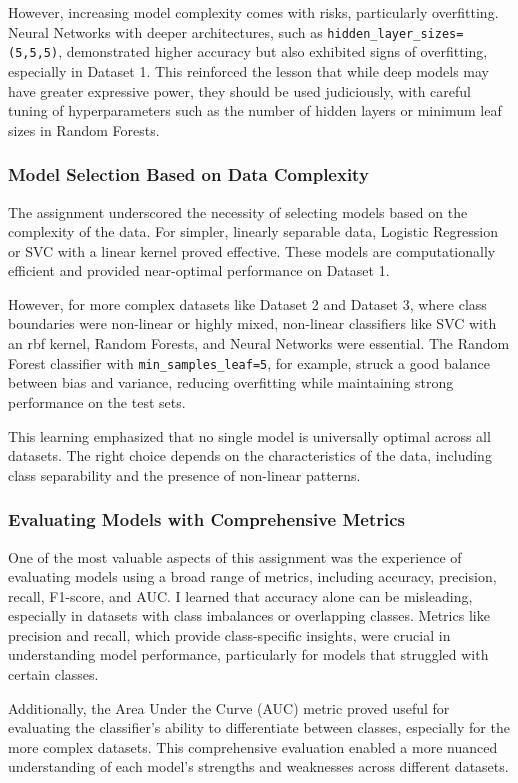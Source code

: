 However, increasing model complexity comes with risks, particularly overfitting. Neural Networks with deeper architectures, such as \texttt{hidden\_layer\_sizes=(5,5,5)}, demonstrated higher accuracy but also exhibited signs of overfitting, especially in Dataset 1. This reinforced the lesson that while deep models may have greater expressive power, they should be used judiciously, with careful tuning of hyperparameters such as the number of hidden layers or minimum leaf sizes in Random Forests.

\subsubsection*{Model Selection Based on Data Complexity}
The assignment underscored the necessity of selecting models based on the complexity of the data. For simpler, linearly separable data, Logistic Regression or SVC with a linear kernel proved effective. These models are computationally efficient and provided near-optimal performance on Dataset 1.

However, for more complex datasets like Dataset 2 and Dataset 3, where class boundaries were non-linear or highly mixed, non-linear classifiers like SVC with an rbf kernel, Random Forests, and Neural Networks were essential. The Random Forest classifier with \texttt{min\_samples\_leaf=5}, for example, struck a good balance between bias and variance, reducing overfitting while maintaining strong performance on the test sets.

This learning emphasized that no single model is universally optimal across all datasets. The right choice depends on the characteristics of the data, including class separability and the presence of non-linear patterns.

\subsubsection*{Evaluating Models with Comprehensive Metrics}
One of the most valuable aspects of this assignment was the experience of evaluating models using a broad range of metrics, including accuracy, precision, recall, F1-score, and AUC. I learned that accuracy alone can be misleading, especially in datasets with class imbalances or overlapping classes. Metrics like precision and recall, which provide class-specific insights, were crucial in understanding model performance, particularly for models that struggled with certain classes.

Additionally, the Area Under the Curve (AUC) metric proved useful for evaluating the classifier's ability to differentiate between classes, especially for the more complex datasets. This comprehensive evaluation enabled a more nuanced understanding of each model's strengths and weaknesses across different datasets.

